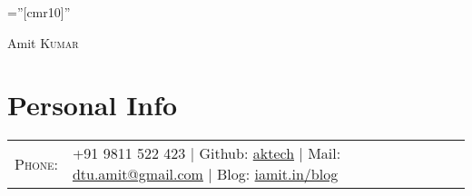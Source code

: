 \documentclass[a4paper,10pt]{article}
\begin{document}

\pagestyle{empty} %

\font\fb=''[cmr10]'' %

\par{\centering
		{\Huge Amit \textsc{Kumar}
	}\bigskip\par}

\section{Personal Info}

\begin{tabular}{rl}
    \textsc{Phone:}     & +91 9811 522 423  |  Github: \href{https://github.com/aktech}{aktech} | Mail: \href{mailto:dtu.amit@gmail.com}{dtu.amit@gmail.com} | Blog: \href{http://iamit.in/blog}{iamit.in/blog}
\end{tabular}

\end{document}
